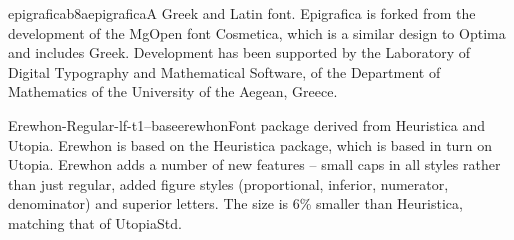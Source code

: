 \documentclass{ddltxtyp}
\begin{document}
\begin{package}{epigraficab8a}{epigrafica}{A Greek and Latin font.}
Epigrafica is forked from the development of the MgOpen font
Cosmetica, which is a similar design to Optima and includes
Greek. Development has been supported by the Laboratory of
Digital Typography and Mathematical Software, of the Department
of Mathematics of the University of the Aegean, Greece.
\end{package}

\begin{package}{Erewhon-Regular-lf-t1--base}{erewhon}{Font package derived from Heuristica and Utopia.}
Erewhon is based on the Heuristica package, which is based in
turn on Utopia. Erewhon adds a number of new features -- small
caps in all styles rather than just regular, added figure
styles (proportional, inferior, numerator, denominator) and
superior letters. The size is 6{\%} smaller than Heuristica,
matching that of UtopiaStd.
\end{package}

\end{document}
